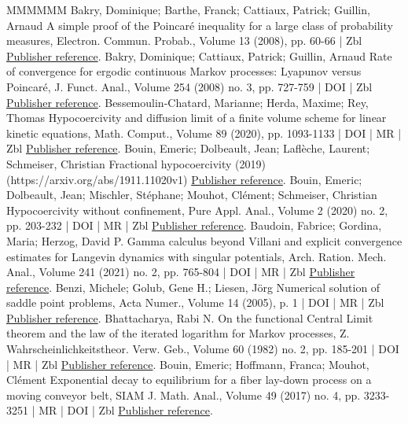 \documentclass[10pt,a4paper]{article}
\numberwithin{equation}{section}
\begin{document}
\begin{thebibliography}{MMMMMM}
 Bakry, Dominique; Barthe, Franck; Cattiaux, Patrick; Guillin, Arnaud A simple proof of the Poincaré inequality for a large class of probability measures, Electron. Commun. Probab., Volume 13 (2008), pp. 60-66 | Zbl \href{https://ahl.centre-mersenne.org/item/AHL_2022__5__523_0/#BBCG}{Publisher reference}.
 Bakry, Dominique; Cattiaux, Patrick; Guillin, Arnaud Rate of convergence for ergodic continuous Markov processes: Lyapunov versus Poincaré, J. Funct. Anal., Volume 254 (2008) no. 3, pp. 727-759 | DOI | Zbl \href{https://ahl.centre-mersenne.org/item/AHL_2022__5__523_0/#BCG08}{Publisher reference}.
 Bessemoulin-Chatard, Marianne; Herda, Maxime; Rey, Thomas Hypocoercivity and diffusion limit of a finite volume scheme for linear kinetic equations, Math. Comput., Volume 89 (2020), pp. 1093-1133 | DOI | MR | Zbl \href{https://ahl.centre-mersenne.org/item/AHL_2022__5__523_0/#BCHR19}{Publisher reference}.
 Bouin, Emeric; Dolbeault, Jean; Laflèche, Laurent; Schmeiser, Christian Fractional hypocoercivity (2019) (https://arxiv.org/abs/1911.11020v1) \href{https://ahl.centre-mersenne.org/item/AHL_2022__5__523_0/#BDLS19}{Publisher reference}.
 Bouin, Emeric; Dolbeault, Jean; Mischler, Stéphane; Mouhot, Clément; Schmeiser, Christian Hypocoercivity without confinement, Pure Appl. Anal., Volume 2 (2020) no. 2, pp. 203-232 | DOI | MR | Zbl \href{https://ahl.centre-mersenne.org/item/AHL_2022__5__523_0/#BDMMS17}{Publisher reference}.
 Baudoin, Fabrice; Gordina, Maria; Herzog, David P. Gamma calculus beyond Villani and explicit convergence estimates for Langevin dynamics with singular potentials, Arch. Ration. Mech. Anal., Volume 241 (2021) no. 2, pp. 765-804 | DOI | MR | Zbl \href{https://ahl.centre-mersenne.org/item/AHL_2022__5__523_0/#BGH19}{Publisher reference}.
 Benzi, Michele; Golub, Gene H.; Liesen, Jörg Numerical solution of saddle point problems, Acta Numer., Volume 14 (2005), p. 1 | DOI | MR | Zbl \href{https://ahl.centre-mersenne.org/item/AHL_2022__5__523_0/#benzi2005numerical}{Publisher reference}.
 Bhattacharya, Rabi N. On the functional Central Limit theorem and the law of the iterated logarithm for Markov processes, Z. Wahrscheinlichkeitstheor. Verw. Geb., Volume 60 (1982) no. 2, pp. 185-201 | DOI | MR | Zbl \href{https://ahl.centre-mersenne.org/item/AHL_2022__5__523_0/#Bhattacharya}{Publisher reference}.
 Bouin, Emeric; Hoffmann, Franca; Mouhot, Clément Exponential decay to equilibrium for a fiber lay-down process on a moving conveyor belt, SIAM J. Math. Anal., Volume 49 (2017) no. 4, pp. 3233-3251 | MR | DOI | Zbl \href{https://ahl.centre-mersenne.org/item/AHL_2022__5__523_0/#BHM17}{Publisher reference}.

\end{thebibliography}
\end{document}
